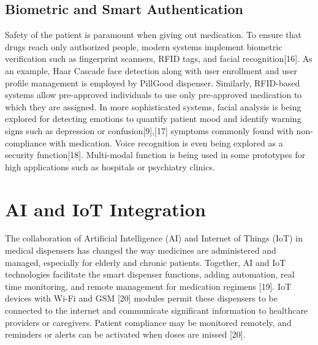 \subsection{ Biometric and Smart Authentication}
Safety of the patient is paramount when giving out medication. To ensure that drugs reach only authorized people, modern systems implement biometric verification such as fingerprint scanners, RFID tags, and facial recognition[16]. As an example, Haar Cascade face detection along with user enrollment and user profile management is employed by PillGood dispenser. Similarly, RFID-based systems allow pre-approved individuals to use only pre-approved medication to which they are assigned.
In more sophisticated systems, facial analysis is being explored for detecting emotions to quantify patient mood and identify warning signs such as depression or confusion[9],[17]  symptoms commonly found with non-compliance with medication.
Voice recognition is even being explored as a security function[18]. Multi-modal function is being used in some prototypes for high applications such as hospitals or psychiatry clinics.


\section{ AI and IoT Integration}
The collaboration of Artificial Intelligence (AI) and Internet of Things (IoT) in medical dispensers has changed the way medicines are administered and managed, especially for elderly and chronic patients. Together, AI and IoT technologies facilitate the smart dispenser functions, adding automation, real time monitoring, and remote management for medication regimens [19]. IoT devices with Wi-Fi and GSM [20] modules permit these dispensers to be connected to the internet and communicate significant information to healthcare providers or caregivers. Patient compliance may be monitored remotely, and reminders or alerts can be activated when doses are missed [20].

